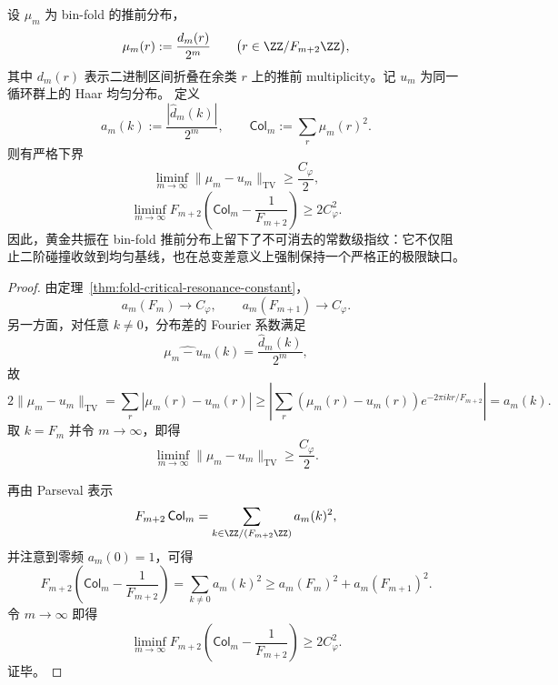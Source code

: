 \begin{theorem}[黄金共振导致的不可达常数隙]\label{thm:xi-time-part55ba-golden-resonance-nonuniform-gap}
设 \(\mu_m\) 为 bin-fold 的推前分布，
\[
\mu_m(r):=\frac{d_m(r)}{2^m}
\qquad
\bigl(r\in \ZZ/F_{m+2}\ZZ\bigr),
\]
其中 \(d_m(r)\) 表示二进制区间折叠在余类 \(r\) 上的推前 multiplicity。记 \(u_m\) 为同一循环群上的 Haar 均匀分布。
定义
\[
a_m(k):=\frac{|\widehat d_m(k)|}{2^m},
\qquad
\mathsf{Col}_m:=\sum_{r}\mu_m(r)^2.
\]
则有严格下界
\[
\liminf_{m\to\infty}\|\mu_m-u_m\|_{\mathrm{TV}}
\ge \frac{C_\varphi}{2},
\]
\[
\liminf_{m\to\infty}
F_{m+2}\left(\mathsf{Col}_m-\frac1{F_{m+2}}\right)
\ge 2C_\varphi^2.
\]
因此，黄金共振在 bin-fold 推前分布上留下了不可消去的常数级指纹：它不仅阻止二阶碰撞收敛到均匀基线，也在总变差意义上强制保持一个严格正的极限缺口。
\end{theorem}
\begin{proof}
由定理~\ref{thm:fold-critical-resonance-constant}，
\[
a_m(F_m)\longrightarrow C_\varphi,
\qquad
a_m(F_{m+1})\longrightarrow C_\varphi.
\]
另一方面，对任意 \(k\neq 0\)，分布差的 Fourier 系数满足
\[
\widehat{\mu_m-u_m}(k)=\frac{\widehat d_m(k)}{2^m},
\]
故
\[
2\|\mu_m-u_m\|_{\mathrm{TV}}
=
\sum_r|\mu_m(r)-u_m(r)|
\ge
\left|\sum_r(\mu_m(r)-u_m(r))e^{-2\pi i kr/F_{m+2}}\right|
=
a_m(k).
\]
取 \(k=F_m\) 并令 \(m\to\infty\)，即得
\[
\liminf_{m\to\infty}\|\mu_m-u_m\|_{\mathrm{TV}}
\ge \frac{C_\varphi}{2}.
\]

再由 Parseval 表示
\[
F_{m+2}\,\mathsf{Col}_m=\sum_{k\in \ZZ/(F_{m+2}\ZZ)}a_m(k)^2,
\]
并注意到零频 \(a_m(0)=1\)，可得
\[
F_{m+2}\left(\mathsf{Col}_m-\frac1{F_{m+2}}\right)
=
\sum_{k\neq 0}a_m(k)^2
\ge
a_m(F_m)^2+a_m(F_{m+1})^2.
\]
令 \(m\to\infty\) 即得
\[
\liminf_{m\to\infty}
F_{m+2}\left(\mathsf{Col}_m-\frac1{F_{m+2}}\right)
\ge 2C_\varphi^2.
\]
证毕。
\end{proof}

\endinput
